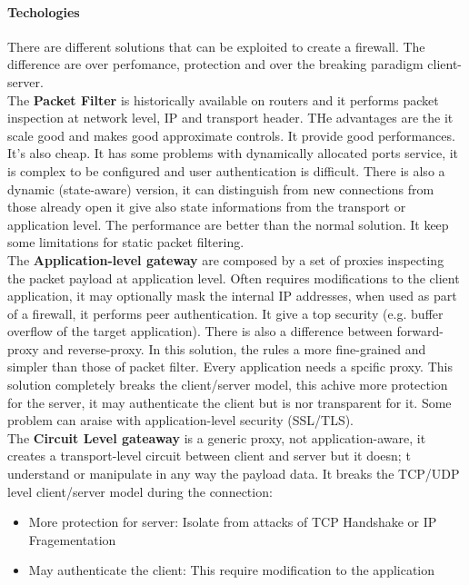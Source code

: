 \documentclass[12pt]{article}
\begin{document}
\paragraph{Techologies} There are different solutions that can be exploited to create a firewall. The difference are over perfomance, protection and over the breaking paradigm client-server.\\
The \textbf{Packet Filter} is historically available on routers and it performs packet inspection at network level, IP and transport header. THe advantages are the it scale good and makes good approximate controls. It provide good performances. It's also cheap. It has some problems with dynamically allocated ports service, it is complex to be configured and user authentication is difficult. There is also a dynamic (state-aware) version, it can distinguish from new connections from those already open it give also state informations from the transport or application level. The performance are better than the normal solution. It keep some limitations for static packet filtering.\\
The \textbf{Application-level gateway} are composed by a set of proxies inspecting the packet payload at application level. Often requires modifications to the client application, it may optionally mask the internal IP addresses, when used as part of a firewall, it performs peer authentication. It give a top security (e.g. buffer overflow of the target application). There is also a difference between forward-proxy and reverse-proxy. In this solution, the rules a more fine-grained and simpler than those of packet filter. Every application needs a spcific proxy. This solution completely breaks the client/server model, this achive more protection for the server, it may authenticate the client but is nor transparent for it. Some problem can araise with application-level security (SSL/TLS).\\
The \textbf{Circuit Level gateaway} is a generic proxy, not application-aware, it creates a transport-level circuit between client and server but it doesn; t understand or manipulate in any way the payload data. It breaks the TCP/UDP level client/server model during the connection:
\begin{itemize}
  \item More protection for server: Isolate from attacks of TCP Handshake or IP Fragementation
  \item May authenticate the client: This require modification to the application
\end{itemize}
\end{document}
